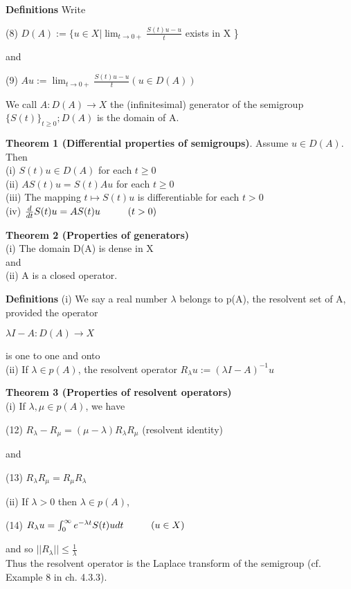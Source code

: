 \documentclass{article}
\newcommand\tab[1][1cm]{\hspace*{#1}}
\begin{document}
\textbf {Definitions} Write 
\begin{center}
(8) \tab $ D(A) := \{ u \in X | \lim_{t \to 0+} \frac{S(t)u-u}{t}$ exists in X \}
\end{center}
and
\begin{center}
(9) \tab $Au := \lim_{t \to 0+} \frac{S(t)u-u}{t} (u \in D(A))$
\end{center}
We call $A : D(A) \to X$ the (infinitesimal) generator of the semigroup $\{S(t)\}_{t \geq 0}; D(A)$ is the domain of A.

\textbf {Theorem 1 (Differential properties of semigroups)}. Assume $u \in D(A)$. Then \\
\tab (i) $S(t)u \in D(A)$ for each $t \geq 0$ \\
\tab (ii) $AS(t)u = S(t)Au$ for each $t \geq 0$ \\
\tab (iii) The mapping $t \mapsto S(t)u$ is differentiable for each $t > 0$ \\
\tab (iv) $\frac{d}{dt}S(t)u = AS(t)u \tab (t > 0)$

\textbf {Theorem 2 (Properties of generators)} \\ 
\tab (i) The domain D(A) is dense in X \\
and \\
\tab (ii) A is a closed operator.

\textbf {Definitions} (i) We say a real number $\lambda$ belongs to p(A), the resolvent set of A, provided the operator
\begin{center}
$\lambda I - A : D(A) \to X$
\end{center}
is one to one and onto \\
\tab (ii) If $\lambda \in p(A)$, the resolvent operator $R_{\lambda}u := (\lambda I- A)^{-1} u$ 

\textbf {Theorem 3 (Properties of resolvent operators)} \\ 
\tab (i) If $\lambda, \mu \in p(A)$, we have 
\begin{center}
(12) \tab $R_{\lambda} - R_{\mu} = (\mu - \lambda) R_{\lambda} R_{\mu}$ \tab (resolvent identity)
\end{center}
and 
\begin{center}
(13) \tab $R_{\lambda} R_{\mu} = R_{\mu} R_{\lambda} $
\end{center}
\tab (ii) If $\lambda > 0$ then $\lambda \in p(A)$,
\begin{center}
(14) \tab $R_{\lambda}u = \int_0^{\infty} e^{-\lambda t} S(t) u dt \tab (u \in X)$
\end{center}
and so $||R_{\lambda}|| \leq \frac{1}{\lambda}$ \\
Thus the resolvent operator is the Laplace transform of the semigroup (cf. Example 8 in ch. 4.3.3).
\end{document}
